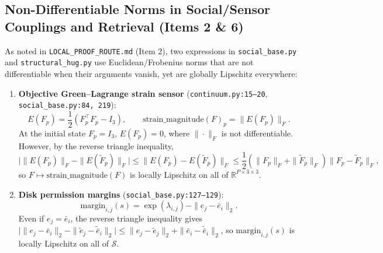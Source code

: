 \documentclass[11pt,a4paper]{article}
\theoremstyle{definition}
\begin{document}
\subsection{Non-Differentiable Norms in Social/Sensor Couplings and Retrieval (Items 2 \& 6)}

As noted in \texttt{LOCAL\_PROOF\_ROUTE.md} (Item 2), two expressions in \texttt{social\_base.py} and \texttt{structural\_hug.py} use Euclidean/Frobenius norms that are not differentiable when their arguments vanish, yet are globally Lipschitz everywhere:
\begin{enumerate}
  \item \textbf{Objective Green--Lagrange strain sensor} (\texttt{continuum.py:15--20}, \texttt{social\_base.py:84, 219}):
  \begin{equation}
    E(F_p) = \frac{1}{2}\left(F_p^\top F_p - I_3\right), \qquad \mathrm{strain\_magnitude}(F)_p = \|E(F_p)\|_F.
  \end{equation}
  At the initial state $F_p = I_3$, $E(F_p) = 0$, where $\|\cdot\|_F$ is not differentiable. However, by the reverse triangle inequality,
  \begin{equation}
    \big|\|E(F_p)\|_F - \|E(\widetilde{F}_p)\|_F\big| \le \|E(F_p) - E(\widetilde{F}_p)\|_F \le \frac{1}{2}\left(\|F_p\|_F + \|\widetilde{F}_p\|_F\right)\|F_p - \widetilde{F}_p\|_F,
  \end{equation}
  so $F \mapsto \mathrm{strain\_magnitude}(F)$ is locally Lipschitz on all of $\mathbb{R}^{P \times 3 \times 3}$.
  \item \textbf{Disk permission margins} (\texttt{social\_base.py:127--129}):
  \begin{equation}
    \mathrm{margin}_{i,j}(s) = \exp(\lambda_{i,j}) - \|e_j - \bar{e}_i\|_2.
  \end{equation}
  Even if $e_j = \bar{e}_i$, the reverse triangle inequality gives $\big|\|e_j - \bar{e}_i\|_2 - \|\widetilde{e}_j - \widetilde{\bar{e}}_i\|_2\big| \le \|e_j - \widetilde{e}_j\|_2 + \|\bar{e}_i - \widetilde{\bar{e}}_i\|_2$, so $\mathrm{margin}_{i,j}(s)$ is locally Lipschitz on all of $\mathcal{S}$.
\end{enumerate}
\end{document}
